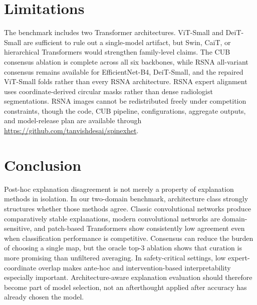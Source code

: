 \documentclass{bmvc2k}
\begin{document}
\section{Limitations}

The benchmark includes two Transformer architectures. ViT-Small and DeiT-Small are sufficient to rule out a single-model artifact, but Swin, CaiT, or hierarchical Transformers would strengthen family-level claims. The CUB consensus ablation is complete across all six backbones, while RSNA all-variant consensus remains available for EfficientNet-B4, DeiT-Small, and the repaired ViT-Small folds rather than every RSNA architecture. RSNA expert alignment uses coordinate-derived circular masks rather than dense radiologist segmentations. RSNA images cannot be redistributed freely under competition constraints, though the code, CUB pipeline, configurations, aggregate outputs, and model-release plan are available through \url{https://github.com/tanvishdesai/spinexhet}.

\section{Conclusion}

Post-hoc explanation disagreement is not merely a property of explanation methods in isolation. In our two-domain benchmark, architecture class strongly structures whether those methods agree. Classic convolutional networks produce comparatively stable explanations, modern convolutional networks are domain-sensitive, and patch-based Transformers show consistently low agreement even when classification performance is competitive. Consensus can reduce the burden of choosing a single map, but the oracle top-$3$ ablation shows that curation is more promising than unfiltered averaging. In safety-critical settings, low expert-coordinate overlap makes ante-hoc and intervention-based interpretability especially important. Architecture-aware explanation evaluation should therefore become part of model selection, not an afterthought applied after accuracy has already chosen the model.


\end{document}
